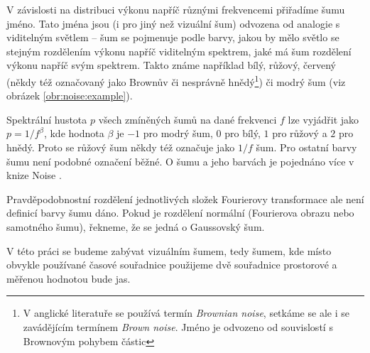 V závislosti na distribuci výkonu napříč různými frekvencemi přiřadíme šumu jméno. Tato jména jsou (i pro jiný než vizuální šum) odvozena od analogie s viditelným světlem -- šum se pojmenuje podle barvy, jakou by mělo světlo se stejným rozdělením výkonu napříč viditelným spektrem, jaké má šum rozdělení výkonu napříč svým spektrem. Takto známe například bílý, růžový, červený (někdy též označovaný jako
Brownův či nesprávně hnědý\footnote{V anglické literatuře se používá
termín {\it Brownian noise}, setkáme se ale i se zavádějícím
termínem {\it Brown noise}. Jméno je odvozeno od souvislostí s Brownovým pohybem částic}) či modrý šum (viz obrázek \ref{obr:noise:example}).

Spektrální hustota $p$ všech zmíněných šumů na dané frekvenci $f$ lze vyjádřit jako
$p=1/f^\beta$, kde hodnota $\beta$ je $-1$ pro modrý šum, $0$ pro bílý, $1$ pro
růžový a $2$ pro hnědý. Proto se růžový šum někdy též označuje jako $1/f$ šum. Pro
ostatní barvy šumu není podobné označení běžné. O šumu a jeho barvách je pojednáno více v
knize Noise \citep{Noise}.

Pravděpodobnostní rozdělení jednotlivých složek Fourierovy transformace ale
není definicí barvy šumu dáno. Pokud je rozdělení normální (Fourierova obrazu nebo samotného šumu), řekneme, že se jedná o Gaussovský šum.

V této práci se budeme zabývat vizuálním šumem, tedy šumem, kde místo obvykle
používané časové souřadnice použijeme dvě souřadnice prostorové a měřenou
hodnotou bude jas. 

